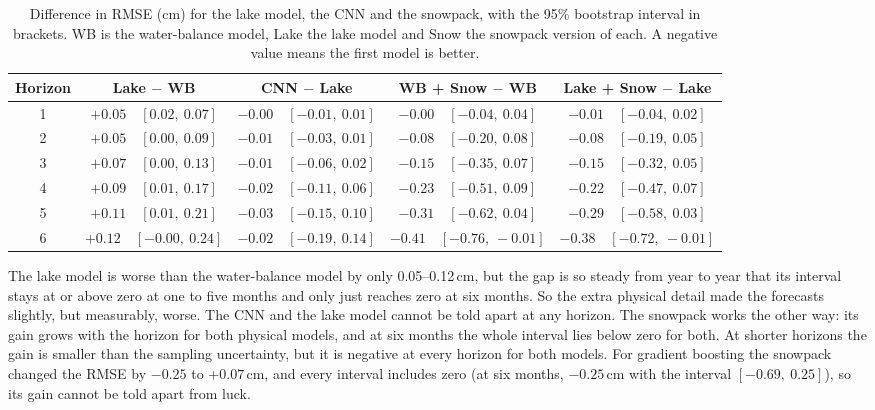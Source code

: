 \documentclass{article}
\begin{document}
\begin{table}[htbp]
\centering
\caption{Difference in RMSE (cm) for the lake model, the CNN and the snowpack, with the 95\% bootstrap interval in
brackets. WB is the water-balance model, Lake the lake model and Snow the snowpack version of
each. A negative value means the first model is better.}
\label{tab:boot2}
\small
\begin{tabular}{||c|c|c|c|c||}
\hline\hline
Horizon & Lake $-$ WB & CNN $-$ Lake & WB + Snow $-$ WB & Lake + Snow $-$ Lake \\
\hline\hline
1 & $+0.05$\ \ $[0.02,\ 0.07]$ & $-0.00$\ \ $[-0.01,\ 0.01]$ & $-0.00$\ \ $[-0.04,\ 0.04]$
& $-0.01$\ \ $[-0.04,\ 0.02]$ \\
2 & $+0.05$\ \ $[0.00,\ 0.09]$ & $-0.01$\ \ $[-0.03,\ 0.01]$ & $-0.08$\ \ $[-0.20,\ 0.08]$
& $-0.08$\ \ $[-0.19,\ 0.05]$ \\
3 & $+0.07$\ \ $[0.00,\ 0.13]$ & $-0.01$\ \ $[-0.06,\ 0.02]$ & $-0.15$\ \ $[-0.35,\ 0.07]$
& $-0.15$\ \ $[-0.32,\ 0.05]$ \\
4 & $+0.09$\ \ $[0.01,\ 0.17]$ & $-0.02$\ \ $[-0.11,\ 0.06]$ & $-0.23$\ \ $[-0.51,\ 0.09]$
& $-0.22$\ \ $[-0.47,\ 0.07]$ \\
5 & $+0.11$\ \ $[0.01,\ 0.21]$ & $-0.03$\ \ $[-0.15,\ 0.10]$ & $-0.31$\ \ $[-0.62,\ 0.04]$
& $-0.29$\ \ $[-0.58,\ 0.03]$ \\
6 & $+0.12$\ \ $[-0.00,\ 0.24]$ & $-0.02$\ \ $[-0.19,\ 0.14]$ & $-0.41$\ \ $[-0.76,\ -0.01]$
& $-0.38$\ \ $[-0.72,\ -0.01]$ \\
\hline\hline
\end{tabular}
\end{table}

The lake model is worse than the water-balance model by only 0.05--0.12\,cm, but the gap is so
steady from year to year that its interval stays at or above zero at one to five months and only
just reaches zero at six months. So the extra physical detail made the forecasts slightly, but
measurably, worse. The CNN and the lake model cannot be told apart at any horizon. The snowpack
works the other way: its gain grows with the horizon for both physical models, and at six months
the whole interval lies below zero for both. At shorter horizons the gain is smaller than the
sampling uncertainty, but it is negative at every horizon for both models. For gradient boosting
the snowpack changed the RMSE by $-0.25$ to $+0.07$\,cm, and every interval includes zero (at six
months, $-0.25$\,cm with the interval $[-0.69,\ 0.25]$), so its gain cannot be told apart from
luck.
\end{document}
